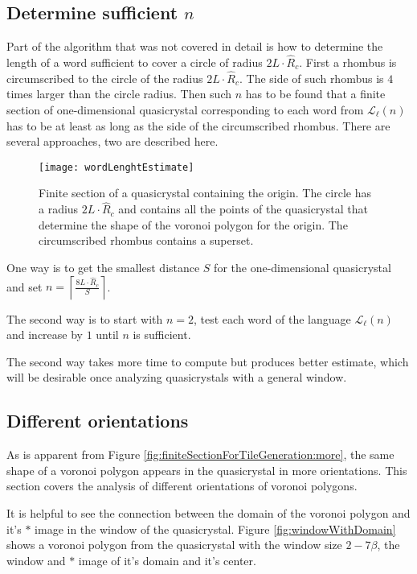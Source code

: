 \documentclass[text.tex]{subfiles}
\begin{document}
\subsection{Determine sufficient $n$}
Part of the algorithm that was not covered in detail is how to determine the length of a word sufficient to cover a circle of radius $2L\cdot\hat{R}_c$. First a rhombus is circumscribed to the circle of the radius $2L\cdot\hat{R}_c$. The side of such rhombus is $4$ times larger than the circle radius. Then such $n$ has to be found that a finite section of one-dimensional quasicrystal corresponding to each word from $\mathcal{L}_{\ell}(n)$ has to be at least as long as the side of the circumscribed rhombus. 
There are several approaches, two are described here. 

\begin{figure}[h]
\centering
\texttt{[image: wordLenghtEstimate]}
\caption{Finite section of a quasicrystal containing the origin. The circle has a radius $2L\cdot\hat{R}_c$ and contains all the points of the quasicrystal that determine the shape of the voronoi polygon for the origin. The circumscribed rhombus contains a superset.}
\label{fig:wordLenghtEstimate}
\end{figure}

One way is to get the smallest distance $S$ for the one-dimensional quasicrystal and set $n = \left\lceil\frac{8L\cdot\hat{R}_c}{S}\right\rceil$. 

The second way is to start with $n=2$, test each word of the language $\mathcal{L}_{\ell}(n)$ and increase by $1$ until $n$ is sufficient. 

The second way takes more time to compute but produces better estimate, which will be desirable once analyzing quasicrystals with a general window.

\subsection{Different orientations}
As is apparent from Figure \ref{fig:finiteSectionForTileGeneration:more}, the same shape of a voronoi polygon appears in the quasicrystal in more orientations. This section covers the analysis of different orientations of voronoi polygons. 

It is helpful to see the connection between the domain of the voronoi polygon and it's $\ast$ image in the window of the quasicrystal. Figure \ref{fig:windowWithDomain} shows a voronoi polygon from the quasicrystal with the window size $2-7\beta$, the window and $\ast$ image of it's domain and it's center. 
\end{document}
